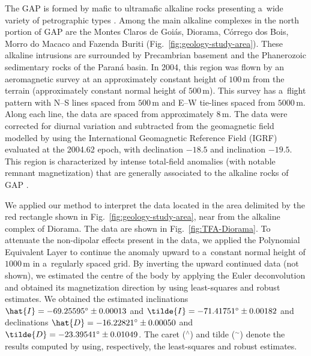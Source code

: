 \documentclass[journal abbreviation, npg]{copernicus}
\begin{document}
The GAP is formed by mafic to ultramafic alkaline rocks presenting a~wide
variety of petrographic types
\citep{almeida1983,junqueira-brod2005,carlson-etal2007,marangoni-mantovani2013}.
Among the main alkaline complexes in the north portion of GAP are the Montes
Claros de Goi\'{a}s, Diorama, C\'{o}rrego dos Bois, Morro do Macaco and
Fazenda Buriti (Fig.~\ref{fig:geology-study-area}). These alkaline intrusions
are surrounded by Precambrian basement and the Phanerozoic sedimentary rocks
of the Paran\'{a} basin. In 2004, this region was flown by an aeromagnetic
survey at an approximately constant height of $100$\,\unit{m} from the
terrain (approximately constant normal height of $500$\,\unit{m}). This
survey has a~flight pattern with N--S lines spaced from $500$\,\unit{m} and
E--W tie-lines spaced from $5000$\,\unit{m}. Along each line, the data are
spaced from approximately $8$\,\unit{m}. The data were corrected for diurnal
variation and subtracted from the geomagnetic field modelled by using the
International Geomagnetic Reference Field (IGRF) evaluated at the 2004.62
epoch, with declination $-18.5${\degree} and inclination $-19.5${\degree}.
This region is characterized by intense total-field anomalies (with notable
remnant magnetization) that are generally associated to the alkaline rocks of
GAP \citep{dutra-marangoni2009,dutra-etal2012,marangoni-mantovani2013}.

We applied our method to interpret the data located in the area delimited by
the red rectangle shown in Fig.~\ref{fig:geology-study-area}, near from the
alkaline complex of Diorama. The data are shown in
Fig.~\ref{fig:TFA-Diorama}. To attenuate the non-dipolar effects present in
the data, we applied the Polynomial Equivalent Layer
\citep{oliveirajr-etal2013} to continue the anomaly upward to a~constant
normal height of $1000$\,\unit{m} in a~regularly spaced grid. By inverting
the upward continued data (not shown), we estimated the centre of the body by
applying the Euler deconvolution and obtained its magnetization direction by
using least-squares and robust estimates. We obtained the estimated
inclinations $\hat{I} = -69.25595{\degree} \pm 0.00013${\degree} and
$\tilde{I} = -71.41751{\degree} \pm 0.00182${\degree} and declinations
$\hat{D} = -16.22821{\degree} \pm 0.00050${\degree} and $\tilde{D} =
-23.39541{\degree} \pm 0.01049${\degree}. The caret ($^{\wedge}$) and tilde
($^{\sim}$) denote the results computed by using, respectively, the
least-squares and robust estimates.
\end{document}
